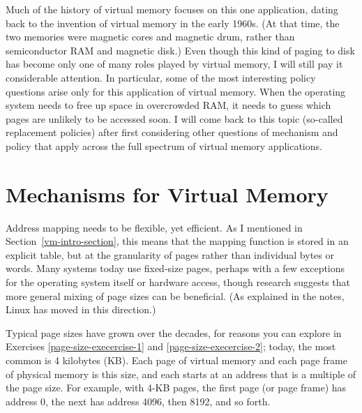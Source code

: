 Much of the history of virtual memory focuses on this one application,
dating back to the invention of virtual memory in the early 1960s.
(At that time, the two memories were magnetic cores and magnetic drum,
rather than semiconductor RAM and magnetic disk.)  Even though this
kind of paging to disk has become only one of many roles played by
virtual memory, I will still pay it considerable attention.  In particular,
some of the most interesting policy questions arise only for this
application of virtual memory.  When the operating system needs to
free up space in overcrowded RAM, it needs to guess which pages are
unlikely to be accessed soon. I will come back to this topic
(so-called replacement policies) after first considering other
questions of mechanism and policy that apply across the full spectrum
of virtual memory applications.

\section{Mechanisms for Virtual Memory}
\label{vm-reps}

Address mapping needs to be flexible, yet efficient. As I mentioned
in Section~\ref{vm-intro-section}, this means that the mapping function is stored in an explicit
table, but at the granularity of pages rather than individual bytes or
words.  Many systems today use fixed-size pages, perhaps with a few
exceptions for the operating system itself or hardware access, though
research suggests that more general mixing of page sizes can be
beneficial.  (As explained in the notes, Linux has moved in this direction.)

Typical page sizes have grown over the decades, for reasons you can
explore in Exercises \ref{page-size-execercise-1} and \ref{page-size-execercise-2}; today, the most common
is 4 kilobytes (KB).  Each page of virtual memory and each page frame of physical
memory is this size, and each starts at an address that is a multiple
of the page size.  For example, with 4-KB pages, the first page (or
page frame) has address 0, the next has address 4096, then 8192, and
so forth.

